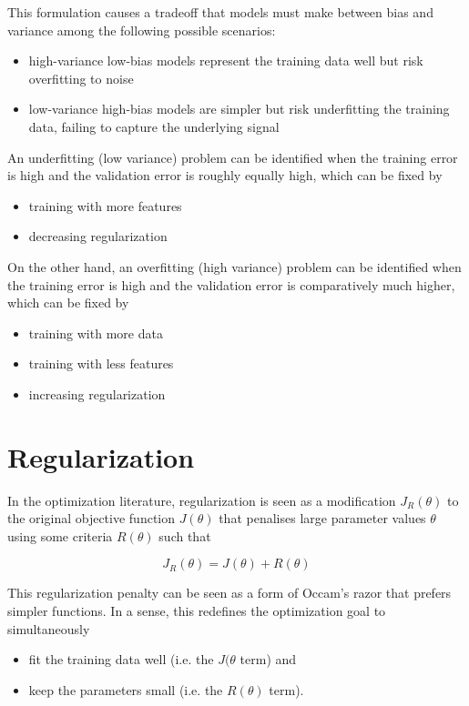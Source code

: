 This formulation causes a tradeoff that models must make between bias and variance among the following possible scenarios:

\begin{itemize}
    \item high-variance low-bias models represent the training data well but risk overfitting to noise
    \item low-variance high-bias models are simpler but risk underfitting the training data, failing to capture the underlying signal
\end{itemize}

An underfitting (low variance) problem can be identified when the training error is high and the validation error is roughly equally high, which can be fixed by

\begin{itemize}
    \item training with more features
    \item decreasing regularization
\end{itemize}

On the other hand, an overfitting (high variance) problem can be identified when the training error is high and the validation error is comparatively much higher, which can be fixed by

\begin{itemize}
    \item training with more data
    \item training with less features
    \item increasing regularization
\end{itemize}

\section{Regularization}

In the optimization literature, regularization is seen as a modification $J_R(\theta)$ to the original objective function $J(\theta)$ that penalises large parameter values $\theta$ using some criteria $R(\theta)$ such that

$$
J_R(\theta) = J(\theta) + R(\theta)
$$

This regularization penalty can be seen as a form of Occam's razor that prefers simpler functions. In a sense, this redefines the optimization goal to simultaneously

\begin{itemize}
    \item fit the training data well (i.e. the $J(\theta$ term) and
    \item keep the parameters small (i.e. the $R(\theta)$ term).
\end{itemize}


